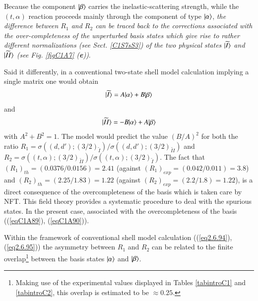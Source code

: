  Because the component $|{\beta} \rangle$ carries the inelastic-scattering strength, while the $(t,\alpha)$ reaction proceeds mainly through the component of type $|{\alpha} \rangle$, \textit{the difference between $R_1$ and $R_2$ can be traced back to the corrections associated with the over-completeness of the unperturbed basis states which give rise to rather different normalizations (see Sect. \ref{C1S7sS3}) of the two physical states $|{\widetilde I} \rangle$ and $|{\widetilde {II}} \rangle$ (see Fig. \ref{figC1A7} (\textbf{e}))}. 


Said it differently, in a conventional two-state shell model calculation implying a single matrix one would obtain
  \begin{align}\label{eq2.6.94} 
|{\widetilde I} \rangle=A|{\alpha} \rangle+B|{\beta} \rangle
\end{align} 
and
  \begin{align}\label{eq2.6.95} 
|{\widetilde {II}} \rangle=-B|{\alpha} \rangle+A|{\beta} \rangle
\end{align} 
with $A^2+B^2=1$. The model would predict the value $(B/A)^2$ for both the ratio $R_1=\sigma((d,d');(3/2)_{\widetilde I})/\sigma((d,d');(3/2)_{\widetilde {II}})$ and $R_2=\sigma((t,\alpha);(3/2)_{\widetilde {II}})/\sigma((t,\alpha);(3/2)_{\widetilde {I}})$. The fact that $(R_1)_{th}=(0.0376/0.0156)=2.41$ (against $(R_1)_{exp}=(0.042/0.011)=3.8$) and $(R_2)_{th}=(2.25/1.83)=1.22$ (against $(R_2)_{exp}=(2.2/1.8)=1.22$), is a direct consequence of the overcompleteness of the basis which is taken care by NFT. This field theory provides a systematic  procedure to deal with the spurious states. In the present case, associated with the overcompleteness of the basis ((\ref{eqC1A89}), (\ref{eqC1A90})).

Within the framework of conventional shell model calculation ((\ref{eq2.6.94}), (\ref{eq2.6.95})) the asymmetry between $R_1$ and $R_2$ can be related to the finite overlap\footnote{Making use of the experimental values displayed in Tables \ref{tabintroC1} and  \ref{tabintroC2}, this overlap is estimated to be $\approx0.25$.} between the basis states $|{\alpha} \rangle$ and $|{\beta} \rangle$.


